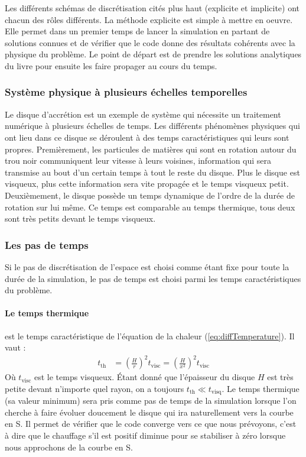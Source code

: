 \documentclass[a4paper,12pt]{article}
\begin{document}
Les différents schémas de discrétisation cités plus haut (explicite et implicite) ont chacun des rôles différents. La méthode explicite est simple à mettre en oeuvre. Elle permet dans un premier temps de lancer la simulation en partant de solutions connues et de vérifier que le code donne des résultats cohérents avec la physique du problème. Le point de départ est de prendre les solutions analytiques du livre \cite{king} pour ensuite les faire propager au cours du temps.

\subsubsection{Système physique à plusieurs échelles temporelles}
 
Le disque d'accrétion est un exemple de système qui nécessite un traitement numérique à plusieurs échelles de temps. Les différents phénomènes physiques qui ont lieu dans ce disque se déroulent à des temps caractéristiques qui leurs sont propres. Premièrement, les particules de matières qui sont en rotation autour du trou noir communiquent leur vitesse à leurs voisines, information qui sera transmise au bout d'un certain temps à tout le reste du disque. Plus le disque est visqueux, plus cette information sera vite propagée et le temps visqueux petit.
Deuxièmement, le disque possède un temps dynamique de l'ordre de la durée de rotation sur lui même. Ce temps est comparable au temps thermique, tous deux sont très petits devant le temps visqueux.


\subsubsection{Les pas de temps}
Si le pas de discrétisation de l'espace est choisi comme étant fixe pour toute la durée de la simulation, le pas de temps est choisi parmi les temps caractéristiques du problème.
\paragraph{Le temps thermique} est le temps caractéristique de l'équation de la chaleur (\ref{eq:diffTemperature}). Il vaut :
\begin{align}
t_\text{th} &= \left(\frac{H}{r}\right)^2t_\text{visc} = \left(\frac{H}{x^2}\right)^2t_\text{visc}
\end{align}
Où $t_\text{visc}$ est le temps visqueux. Étant donné que l'épaisseur du disque $H$ est très petite devant n'importe quel rayon, on a toujours $t_\text{th} \ll t_\text{visq}$.
Le temps thermique (sa valeur minimum) sera pris comme pas de temps de la simulation lorsque l'on cherche à faire évoluer doucement le disque qui ira naturellement vers la courbe en S. Il permet de vérifier que le code converge vers ce que nous prévoyons, c'est à dire que le chauffage s'il est positif diminue pour se stabiliser à zéro lorsque nous approchons de la courbe en S.
\end{document}
